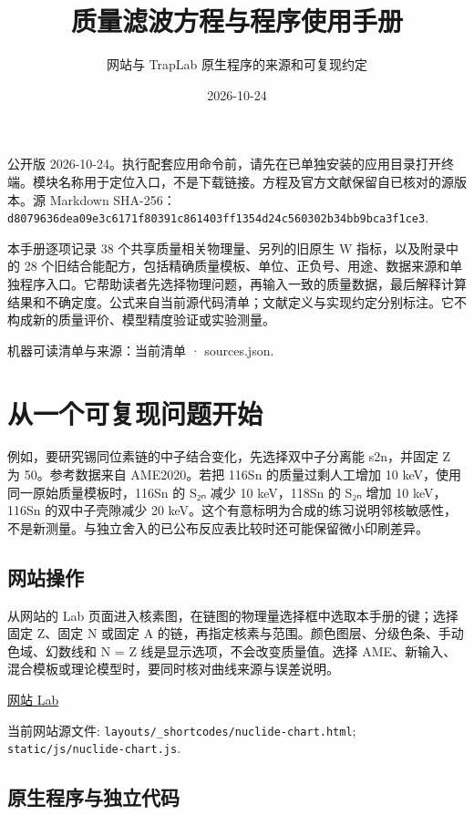 \documentclass[
  11pt,
  letterpaper,
]{article}
\title{质量滤波方程与程序使用手册}
\subtitle{网站与 TrapLab 原生程序的来源和可复现约定}
\author{}
\date{2026-10-24}
\begin{document}
\maketitle

公开版
2026-10-24。执行配套应用命令前，请先在已单独安装的应用目录打开终端。模块名称用于定位入口，不是下载链接。方程及官方文献保留自已核对的源版本。源
Markdown
SHA-256：\texttt{d8079636dea09e3c6171f80391c861403ff1354d24c560302b34bb9bca3f1ce3}.

本手册逐项记录 38 个共享质量相关物理量、另列的旧原生 W
指标，以及附录中的 28
个旧结合能配方，包括精确质量模板、单位、正负号、用途、数据来源和单独程序入口。它帮助读者先选择物理问题，再输入一致的质量数据，最后解释计算结果和不确定度。公式来自当前源代码清单；文献定义与实现约定分别标注。它不构成新的质量评价、模型精度验证或实验测量。

机器可读清单与来源：当前清单 · sources.json.

\section{从一个可复现问题开始}\label{ux4eceux4e00ux4e2aux53efux590dux73b0ux95eeux9898ux5f00ux59cb}

例如，要研究锡同位素链的中子结合变化，先选择双中子分离能 s2n，并固定 Z
为 50。参考数据来自 AME2020。若把 116Sn 的质量过剩人工增加 10
keV，使用同一原始质量模板时，116Sn 的 S₂ₙ 减少 10 keV，118Sn 的 S₂ₙ 增加
10 keV，116Sn 的双中子壳隙减少 20
keV。这个有意标明为合成的练习说明邻核敏感性，不是新测量。与独立舍入的已公布反应表比较时还可能保留微小印刷差异。

\subsection{网站操作}\label{ux7f51ux7ad9ux64cdux4f5c}

从网站的 Lab
页面进入核素图，在链图的物理量选择框中选取本手册的键；选择固定 Z、固定 N
或固定 A 的链，再指定核素与范围。颜色图层、分级色条、手动色域、幻数线和
N = Z 线是显示选项，不会改变质量值。选择
AME、新输入、混合模板或理论模型时，要同时核对曲线来源与误差说明。

\href{https://gezhuang0717.github.io/traps.github.io/zh-hans/lab/}{网站
Lab}

当前网站源文件: \texttt{layouts/\_shortcodes/nuclide-chart.html};
\texttt{static/js/nuclide-chart.js}.

\subsection{原生程序与独立代码}\label{ux539fux751fux7a0bux5e8fux4e0eux72ecux7acbux4ee3ux7801}
\end{document}
